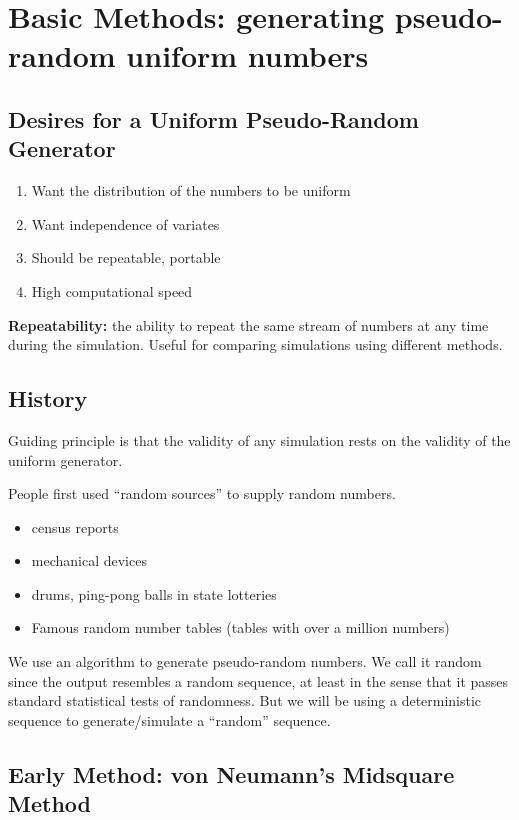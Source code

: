 \documentclass[captions=tableheading]{scrbook}
\begin{document}
\section{Basic Methods: generating pseudo-random uniform numbers}
\label{sec-2_1}
\subsection{Desires for a Uniform Pseudo-Random Generator}
\label{sec-2_1_1}


\begin{enumerate}
\item Want the distribution of the numbers to be uniform
\item Want independence of variates
\item Should be repeatable, portable
\item High computational speed
\end{enumerate}

\textbf{Repeatability:} the ability to repeat the same stream of numbers at any time during the simulation. Useful for comparing simulations using different methods.
\subsection{History}
\label{sec-2_1_2}

Guiding principle is that the validity of any simulation rests on the validity of the uniform generator.

People first used ``random sources'' to supply random numbers.

\begin{itemize}
\item census reports
\item mechanical devices
\item drums, ping-pong balls in state lotteries
\item Famous random number tables (tables with over a million numbers)
\end{itemize}

We use an algorithm to generate pseudo-random numbers. We call it random since the output resembles a random sequence, at least in the sense that it passes standard statistical tests of randomness. But we will be using a deterministic sequence to generate/simulate a ``random'' sequence.
\subsection{Early Method: von Neumann's Midsquare Method}
\label{sec-2_1_3}
\end{document}
